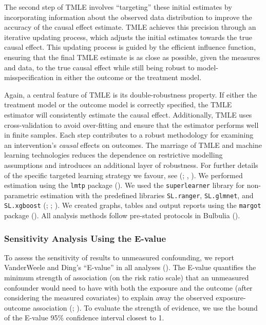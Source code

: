 \documentclass[
  single column]{article}
\begin{document}
The second step of TMLE involves ``targeting'' these initial estimates
by incorporating information about the observed data distribution to
improve the accuracy of the causal effect estimate. TMLE achieves this
precision through an iterative updating process, which adjusts the
initial estimates towards the true causal effect. This updating process
is guided by the efficient influence function, ensuring that the final
TMLE estimate is as close as possible, given the measures and data, to
the true causal effect while still being robust to
model-misspecification in either the outcome or the treatment model.

Again, a central feature of TMLE is its double-robustness property. If
either the treatment model or the outcome model is correctly specified,
the TMLE estimator will consistently estimate the causal effect.
Additionally, TMLE uses cross-validation to avoid over-fitting and
ensure that the estimator performs well in finite samples. Each step
contributes to a robust methodology for examining an intervention's
\emph{causal} effects on outcomes. The marriage of TMLE and machine
learning technologies reduces the dependence on restrictive modelling
assumptions and introduces an additional layer of robustness. For
further details of the specific targeted learning strategy we favour,
see (;
,
). We performed estimation using the
\texttt{lmtp} package (). We used the \texttt{superlearner} library for non-parametric
estimation with the predefined libraries \texttt{SL.ranger},
\texttt{SL.glmnet}, and \texttt{SL.xgboost}
(;
;
). We created graphs,
tables and output reports using the \texttt{margot} package
(). All analysis methods follow
pre-stated protocols in Bulbulia
().

\subsubsection{Sensitivity Analysis Using the
E-value}\label{sensitivity-analysis-using-the-e-value}

To assess the sensitivity of results to unmeasured confounding, we
report VanderWeele and Ding's ``E-value'' in all analyses
(). The E-value
quantifies the minimum strength of association (on the risk ratio scale)
that an unmeasured confounder would need to have with both the exposure
and the outcome (after considering the measured covariates) to explain
away the observed exposure-outcome association
(;
). To
evaluate the strength of evidence, we use the bound of the E-value 95\%
confidence interval closest to 1.
\end{document}
